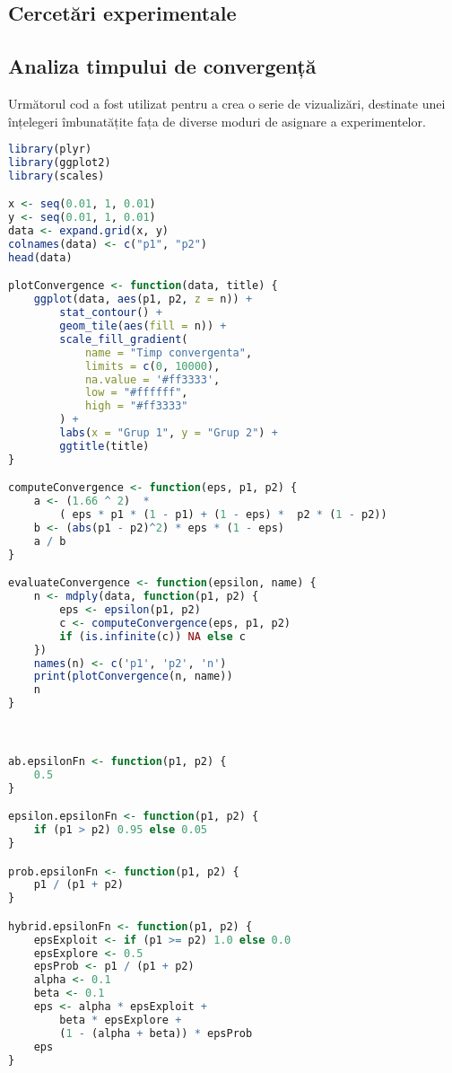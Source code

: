 \begin{appendices}
\chapter{Cercetări experimentale}

\section{Analiza timpului de convergență}

Următorul cod a fost utilizat pentru a crea o serie de vizualizări, destinate unei înțelegeri îmbunatățite fața de diverse moduri de asignare a experimentelor.

\begin{center}
	\begin{lstlisting}[language=r]
library(plyr)
library(ggplot2)
library(scales)

x <- seq(0.01, 1, 0.01)
y <- seq(0.01, 1, 0.01)
data <- expand.grid(x, y)
colnames(data) <- c("p1", "p2")
head(data)

plotConvergence <- function(data, title) {
	ggplot(data, aes(p1, p2, z = n)) +  
		stat_contour() + 
		geom_tile(aes(fill = n)) + 
		scale_fill_gradient(
			name = "Timp convergenta",
			limits = c(0, 10000),
			na.value = '#ff3333',
			low = "#ffffff",
			high = "#ff3333"
		) +
		labs(x = "Grup 1", y = "Grup 2") +
		ggtitle(title)
}

computeConvergence <- function(eps, p1, p2) {
	a <- (1.66 ^ 2)  * 
		( eps * p1 * (1 - p1) + (1 - eps) *  p2 * (1 - p2))
	b <- (abs(p1 - p2)^2) * eps * (1 - eps)
	a / b
}

evaluateConvergence <- function(epsilon, name) {
	n <- mdply(data, function(p1, p2) {
		eps <- epsilon(p1, p2)
		c <- computeConvergence(eps, p1, p2)
		if (is.infinite(c)) NA else c
	})
	names(n) <- c('p1', 'p2', 'n')
	print(plotConvergence(n, name))
	n
}



ab.epsilonFn <- function(p1, p2) {
	0.5
}

epsilon.epsilonFn <- function(p1, p2) {
	if (p1 > p2) 0.95 else 0.05
}

prob.epsilonFn <- function(p1, p2) {
	p1 / (p1 + p2)
}

hybrid.epsilonFn <- function(p1, p2) {
	epsExploit <- if (p1 >= p2) 1.0 else 0.0
	epsExplore <- 0.5
	epsProb <- p1 / (p1 + p2)
	alpha <- 0.1
	beta <- 0.1
	eps <- alpha * epsExploit + 
		beta * epsExplore + 
		(1 - (alpha + beta)) * epsProb
	eps
}


\end{lstlisting}
\end{center}
\end{appendices}
